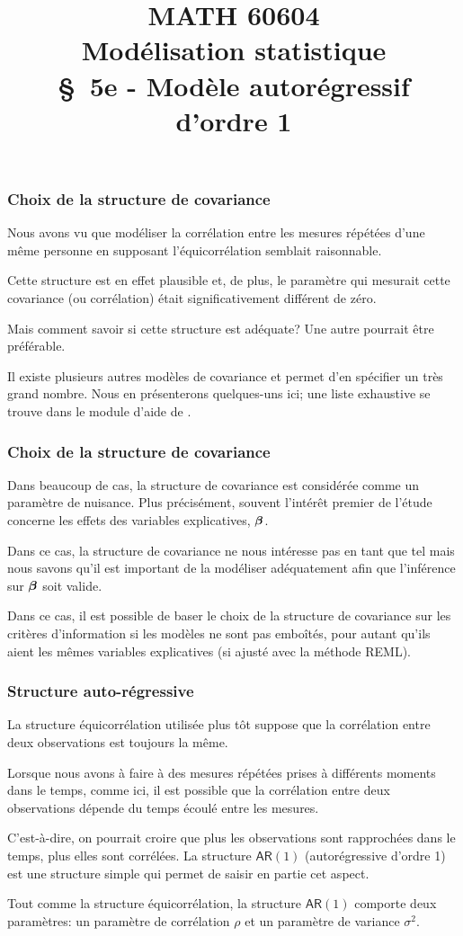 \documentclass{beamer}
\title[\color{white}{MATH 60604 \S~5e - Modèle autorégressif d'ordre 1}]{\texorpdfstring{MATH 60604 \\Modélisation statistique \\ \S~5e - Modèle autorégressif d'ordre 1}{MATH 60604 \\Modélisation statistique \\ \S~5e - Modèle autorégressif d'ordre 1}}
\author{}
\institute{HEC Montréal\\
Département de sciences de la décision}
\date{}
\begin{document}
\frame{\titlepage}

\begin{frame}
\frametitle{Choix de la structure de covariance}
\bi
\item Nous avons vu que modéliser la corrélation entre les
mesures répétées d'une même personne en supposant l'équicorrélation semblait raisonnable. 
\item Cette structure est en effet
plausible et, de plus, le paramètre qui mesurait cette covariance (ou
corrélation) était significativement différent de zéro. 
\item Mais comment savoir si cette structure est adéquate? Une autre pourrait être préférable.
\item Il existe plusieurs autres modèles de covariance et \SASlang{} permet d'en spécifier
un très grand nombre. Nous en présenterons quelques-uns ici; une liste
exhaustive se trouve dans le module d'aide de \SASlang{}.
\ei
\end{frame}

\begin{frame}
\frametitle{Choix de la structure de covariance}
\bi
\item Dans beaucoup de cas, la structure de covariance est considérée comme un
paramètre de nuisance. Plus précisément, souvent l'intérêt premier de l'étude
concerne les effets des variables explicatives, $\boldsymbol {\beta}$. 
\item Dans ce cas, la structure
de covariance ne nous intéresse pas en tant que tel mais nous savons qu'il est
important de la modéliser adéquatement afin que l'inférence sur $\boldsymbol {\beta}$ soit
valide. 
\item Dans ce cas, il est possible de baser le choix de la structure de
covariance sur les critères d'information si les modèles ne sont pas emboîtés, pour autant qu'ils aient les mêmes variables explicatives (si ajusté avec la méthode REML).
\ei
\end{frame}

\begin{frame}
\frametitle{Structure auto-régressive}
\bi
\item La structure équicorrélation utilisée plus tôt suppose que la corrélation
entre deux observations est toujours la même. 
\item Lorsque nous avons à faire à
des mesures répétées prises à différents moments dans le temps, comme ici, 
il est possible que la corrélation entre deux observations dépende du temps
écoulé entre les mesures. 
\item C'est-à-dire, on pourrait croire que plus les
observations sont rapprochées dans le temps, plus elles sont corrélées. La
structure \alert{$\mathsf{AR}(1)$} (\alert{autorégressive d'ordre 1}) est une structure simple qui permet
de saisir en partie cet aspect. 
\item Tout comme la structure équicorrélation, la
structure $\mathsf{AR}(1)$ comporte deux paramètres: un paramètre de corrélation $\rho$ et
un paramètre de variance $\sigma^2$.
\ei
\end{frame}
\end{document}
